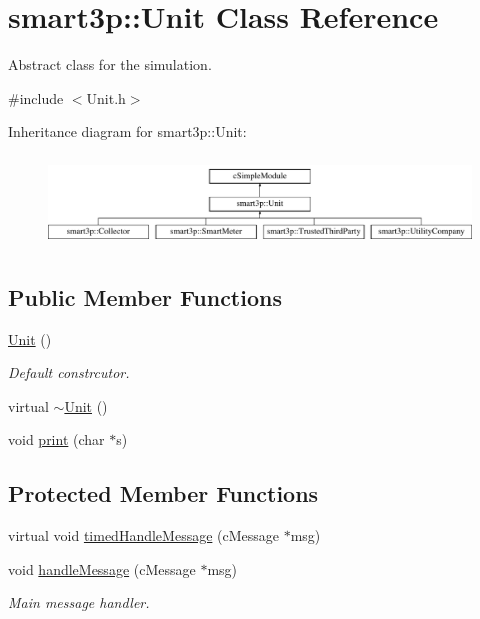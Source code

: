 \hypertarget{classsmart3p_1_1Unit}{}\section{smart3p\+:\+:Unit Class Reference}
\label{classsmart3p_1_1Unit}


Abstract class for the simulation.  




{\ttfamily \#include $<$Unit.\+h$>$}

Inheritance diagram for smart3p\+:\+:Unit\+:\begin{figure}[H]
\begin{center}
\leavevmode
\includegraphics[height=2.456140cm]{classsmart3p_1_1Unit}
\end{center}
\end{figure}
\subsection*{Public Member Functions}
\begin{DoxyCompactItemize}
\item 
\hyperlink{classsmart3p_1_1Unit_ac650bc01f4016ce66b056a9a37793697}{Unit} ()
\begin{DoxyCompactList}\small\item\em Default constrcutor. \end{DoxyCompactList}\item 
virtual \hyperlink{classsmart3p_1_1Unit_af5ab11eebd455ae312399fa3ba813e1b}{$\sim$\+Unit} ()
\item 
void \hyperlink{classsmart3p_1_1Unit_a832d0c6a67960a6d7911df721eda7527}{print} (char $\ast$s)
\end{DoxyCompactItemize}
\subsection*{Protected Member Functions}
\begin{DoxyCompactItemize}
\item 
virtual void \hyperlink{classsmart3p_1_1Unit_a93f16f43dec69d23d8588f3b60c96d69}{timed\+Handle\+Message} (c\+Message $\ast$msg)
\item 
void \hyperlink{classsmart3p_1_1Unit_a7763e2e6ec9e31c7a4743bf674351c13}{handle\+Message} (c\+Message $\ast$msg)
\begin{DoxyCompactList}\small\item\em Main message handler. \end{DoxyCompactList}\end{DoxyCompactItemize}

